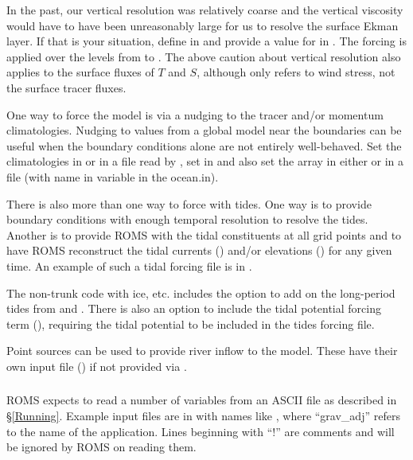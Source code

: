 In the past, our vertical resolution was relatively coarse and the
vertical viscosity would have to have been unreasonably large for
us to resolve the surface Ekman layer.  If that is your situation,
define  in  and provide a value for
 in .  The forcing is applied over the
levels from  to .  The above caution about
vertical resolution also applies to the surface fluxes of $T$ and
$S$, although  only refers to wind stress, not the
surface tracer fluxes.

\smallskip
{}

One way to force the model is via a nudging to the tracer and/or
momentum climatologies. Nudging to values from a global model
near the boundaries can be useful when the boundary conditions alone
are not entirely well-behaved.
Set the climatologies in  or in a
file read by , set  in
 and also set the array  in
either  or in a file (with name in 
variable in the ocean.in).

\smallskip
{}

There is also more than one way to force with tides. One way is to
provide boundary conditions with enough temporal resolution to
resolve the tides. Another is to provide ROMS with the tidal
constituents at all grid points and to have ROMS reconstruct the
tidal currents ()  and/or elevations ()
for any given time. An example of such a tidal forcing file is in
.

The non-trunk code with ice, etc. includes the  option to
add on the long-period tides from
\citet{Foreman_96a} and \citet{Foreman_96b}.
There is also an option to include the tidal potential
forcing term (), requiring the tidal potential to
be included in the tides forcing file.

\smallskip
{}

Point sources can be used to provide river inflow to the model.
These have their own input file () if not provided via
.

\subsubsection{}
\label{ASCII_in}
ROMS expects to read a number of variables from an ASCII file as described
in \S\ref{Running}.
Example input files are in  with names like
, where ``grav\_adj'' refers to the name of
the application. Lines beginning with ``!'' are comments and will be
ignored by ROMS on reading them.

